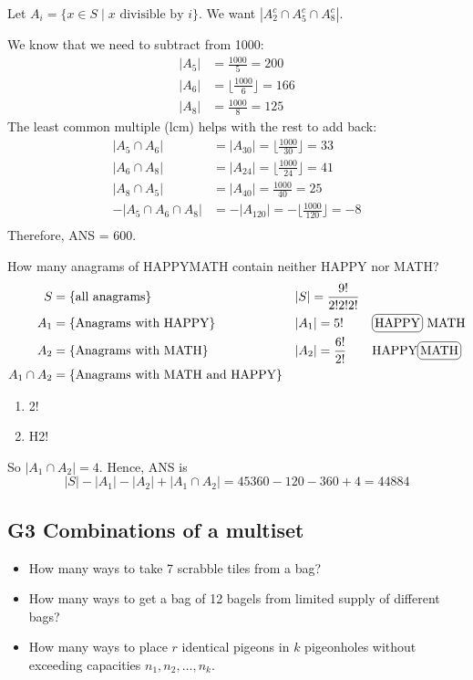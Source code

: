 \documentclass[12pt]{article}
\begin{document}
Let $A_i=\{x\in S \mid x \text{ divisible by }i\}$. We want $\left|A_2^c\cap A_5^c\cap A_8^c\right|$.

We know that we need to subtract from 1000: \begin{align*}
    |A_5| &= \frac{1000}{5}=200\\
    |A_6| &= \lfloor\frac{1000}{6}\rfloor=166\\
    |A_8| &= \frac{1000}{8}=125
\end{align*}
The least common multiple (lcm) helps with the rest to add back:\begin{align*}
    |A_5\cap A_6| &= |A_{30}| = \lfloor\frac{1000}{30}\rfloor=33\\
    |A_6\cap A_8| &= |A_{24}| = \lfloor\frac{1000}{24}\rfloor=41\\
    |A_8\cap A_5| &= |A_{40}| = \frac{1000}{40}=25\\
    -|A_5\cap A_6\cap A_8| &= -|A_{120}| = -\lfloor\frac{1000}{120}\rfloor=-8\\
\end{align*}
Therefore, ANS = 600.

\eg How many anagrams of HAPPYMATH contain neither HAPPY nor MATH?
\begin{align*}
    S&=\{\text{all anagrams}\} &&|S| = \frac{9!}{2!2!2!}\\
    A_1 &= \{\text{Anagrams with HAPPY}\} && |A_1|=5!&\text{\circled{HAPPY}MATH}\\
    A_2 &= \{\text{Anagrams with MATH}\} && |A_2|=\frac{6!}{2!}&\text{HAPPY\circled{MATH}}\\
    A_1\cap A_2  &= \{\text{Anagrams with MATH and HAPPY}\}
\end{align*}
\begin{enumerate}[label=\textit{Case} \arabic*:]
    \item {} \hfill 2!
    \item {}H\hfill 2!
\end{enumerate}
So $|A_1\cap A_2|=4$. Hence, ANS is \[|S|-|A_1|-|A_2|+|A_1\cap A_2| = 45360-120-360+4=44884\]


\subsection{G3 Combinations of a multiset}
\begin{itemize}
    \item How many ways to take 7 scrabble tiles from a bag?

    \item How many ways to get a bag of 12 bagels from limited supply of different bags?
    \item How many ways to place $r$ identical pigeons in $k$ pigeonholes without exceeding capacities $n_1,n_2,\dots, n_k$.
\end{itemize}
\end{document}
